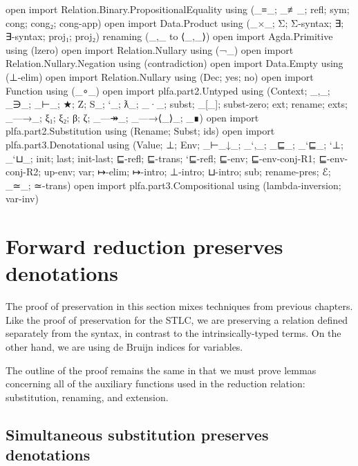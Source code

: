 \begin{fence}
\begin{code}
open import Relation.Binary.PropositionalEquality
  using (_≡_; _≢_; refl; sym; cong; cong₂; cong-app)
open import Data.Product using (_×_; Σ; Σ-syntax; ∃; ∃-syntax; proj₁; proj₂)
  renaming (_,_ to ⟨_,_⟩)
open import Agda.Primitive using (lzero)
open import Relation.Nullary using (¬_)
open import Relation.Nullary.Negation using (contradiction)
open import Data.Empty using (⊥-elim)
open import Relation.Nullary using (Dec; yes; no)
open import Function using (_∘_)
open import plfa.part2.Untyped
     using (Context; _,_; _∋_; _⊢_; ★; Z; S_; `_; ƛ_; _·_;
            subst; _[_]; subst-zero; ext; rename; exts;
            _—→_; ξ₁; ξ₂; β; ζ; _—↠_; _—→⟨_⟩_; _∎)
open import plfa.part2.Substitution using (Rename; Subst; ids)
open import plfa.part3.Denotational
     using (Value; ⊥; Env; _⊢_↓_; _`,_; _⊑_; _`⊑_; `⊥; _`⊔_; init; last; init-last;
            ⊑-refl; ⊑-trans; `⊑-refl; ⊑-env; ⊑-env-conj-R1; ⊑-env-conj-R2; up-env;
            var; ↦-elim; ↦-intro; ⊥-intro; ⊔-intro; sub;
            rename-pres; ℰ; _≃_; ≃-trans)
open import plfa.part3.Compositional using (lambda-inversion; var-inv)
\end{code}
\end{fence}

\hypertarget{forward-reduction-preserves-denotations}{%
\section{Forward reduction preserves
denotations}\label{forward-reduction-preserves-denotations}}

The proof of preservation in this section mixes techniques from previous
chapters. Like the proof of preservation for the STLC, we are preserving
a relation defined separately from the syntax, in contrast to the
intrinsically-typed terms. On the other hand, we are using de Bruijn
indices for variables.

The outline of the proof remains the same in that we must prove lemmas
concerning all of the auxiliary functions used in the reduction
relation: substitution, renaming, and extension.

\hypertarget{simultaneous-substitution-preserves-denotations}{%
\subsection{Simultaneous substitution preserves
denotations}\label{simultaneous-substitution-preserves-denotations}}

